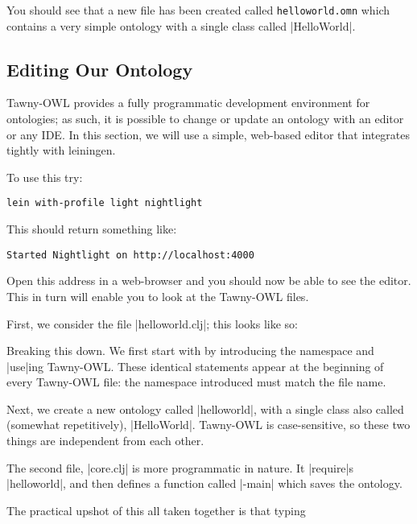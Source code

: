 You should see that a new file has been created called
\verb|helloworld.omn| which contains a very simple ontology with a
single class called |HelloWorld|.

\subsection{Editing Our Ontology}

Tawny-OWL provides a fully programmatic development environment for
ontologies; as such, it is possible to change or update an ontology
with an editor or any IDE. In this section, we will use a simple,
web-based editor that integrates tightly with leiningen.

To use this try:

\begin{verbatim}
lein with-profile light nightlight
\end{verbatim}

This should return something like:

\begin{verbatim}
Started Nightlight on http://localhost:4000
\end{verbatim}

Open this address in a web-browser and you should now be able to see
the editor. This in turn will enable you to look at the Tawny-OWL files.

First, we consider the file |helloworld.clj|; this looks like so:



Breaking this down. We first start with by introducing the namespace
and |use|ing Tawny-OWL. These identical statements appear at the
beginning of every Tawny-OWL file: the namespace introduced must match
the file name.

Next, we create a new ontology called |helloworld|, with a single
class also called (somewhat repetitively), |HelloWorld|. Tawny-OWL is
case-sensitive, so these two things are independent from each other.

The second file, |core.clj| is more programmatic in nature. It
|require|s |helloworld|, and then defines a function called |-main|
which saves the ontology.



The practical upshot of this all taken together is that typing

